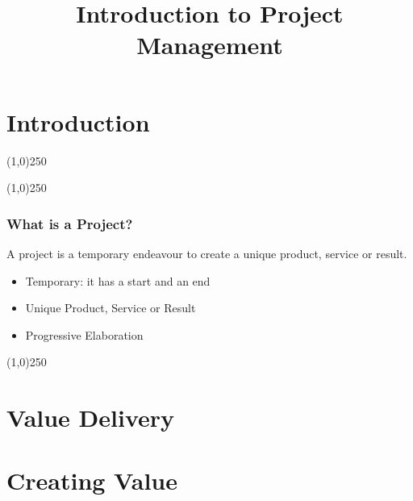 



%
\title[Project Management \& BIM]{Introduction to Project Management}



%
\usetikzlibrary{arrows}



\newpage




\thispagestyle{empty}
\tableofcontents
\newpage
\section{Introduction}


\begin{frame}
\titlepage
\end{frame}\begin{center}\line(1,0){250}\end{center}
%
%
\begin{center}\line(1,0){250}\end{center}



\begin{frame}
\frametitle{What is a Project?}
A project is a temporary endeavour to create a unique product, service or result.\\
\begin{itemize}
\item Temporary: it has a start and an end
\item Unique Product, Service or Result
\item Progressive Elaboration
\end{itemize}
\end{frame}
\begin{center}\line(1,0){250}\end{center}





\section{Value Delivery}

\section{Creating Value}

